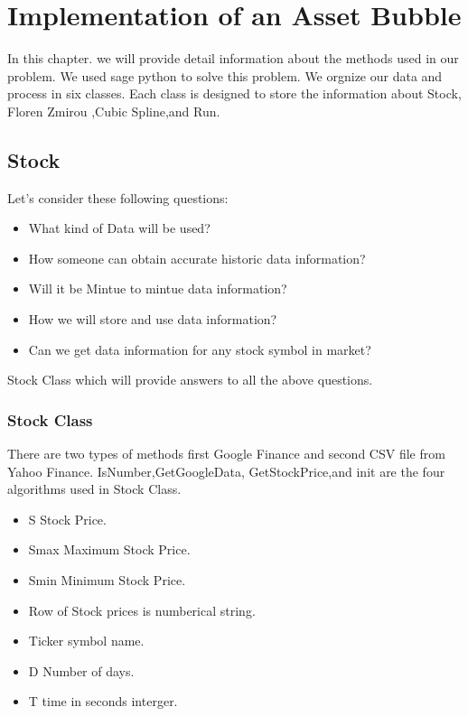 \chapter{Implementation of an Asset Bubble}
In this chapter. we will provide detail information about the methods used in our problem. 
We used sage python to solve this problem. We orgnize our data and process in six classes. 
Each class is designed to store the information about Stock, Floren Zmirou
,Cubic Spline,and Run.
\section{Stock} 
Let's consider these following questions: 
\begin{itemize}
  \item What kind of Data will be used?
  \item How someone can obtain accurate historic data information?
  \item Will it be Mintue to mintue data information?
  \item How we will store and use data information?
  \item Can we get data information for any stock symbol in market?
\end{itemize} 
Stock Class which will provide answers to all the above questions.
\subsection{Stock Class}
There are two types of methods first Google Finance and second CSV file from Yahoo Finance.
IsNumber,GetGoogleData, GetStockPrice,and init are the four algorithms used in Stock Class.
\begin{itemize}
  \item S Stock Price.
  \item Smax Maximum Stock Price. 
  \item Smin Minimum Stock Price.
  \item Row of Stock prices is numberical string.
  \item Ticker symbol name.
  \item D Number of days.
  \item T time in seconds interger.
\end{itemize}

